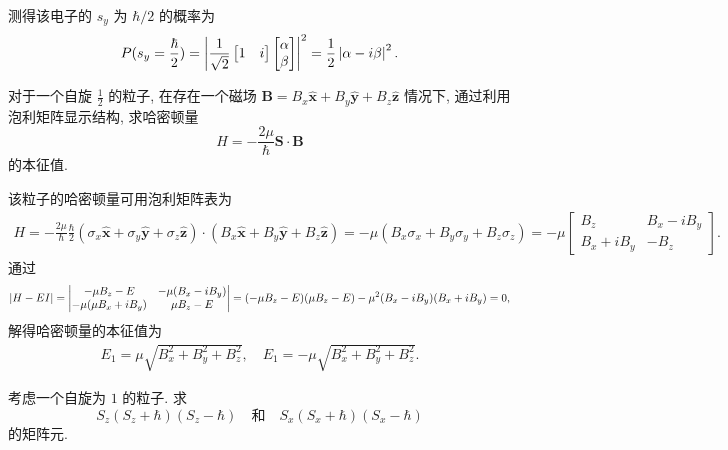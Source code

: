 \documentclass{assignment}
\begin{document}
\begin{sol}
    测得该电子的 $s_y$ 为 $\hbar/2$ 的概率为
    \begin{align}
        P(s_y=\frac{\hbar}{2})=\left\lvert\frac{1}{\sqrt{2}}\begin{bmatrix}
            1&i
        \end{bmatrix}\begin{bmatrix}
            \alpha\\
            \beta
        \end{bmatrix}\right\rvert^2=\frac{1}{2}\left\lvert\alpha-i\beta\right\rvert^2.
    \end{align}
\end{sol}

\begin{prob}[课本习题 3.2]
    对于一个自旋 $\frac{1}{2}$ 的粒子, 在存在一个磁场 $\bm{B}=B_x\hat{\bm{x}}+B_y\hat{\bm{y}}+B_z\hat{\bm{z}}$ 情况下, 通过利用泡利矩阵显示结构, 求哈密顿量
    \[
        H=-\frac{2\mu}{\hbar}\bm{S}\cdot\bm{B}
    \]
    的本征值.
\end{prob}
\begin{sol}
    该粒子的哈密顿量可用泡利矩阵表为
    \begin{align}
        H=-\frac{2\mu}{\hbar}\frac{\hbar}{2}(\sigma_x\hat{\bm{x}}+\sigma_y\hat{\bm{y}}+\sigma_z\hat{\bm{z}})\cdot(B_x\hat{\bm{x}}+B_y\hat{\bm{y}}+B_z\hat{\bm{z}})=-\mu(B_x\sigma_x+B_y\sigma_y+B_z\sigma_z)=-\mu\begin{bmatrix}
            B_z&B_x-iB_y\\
            B_x+iB_y&-B_z
        \end{bmatrix}.
    \end{align}
    通过
    \begin{align}
        \left\lvert H-EI\right\rvert=\begin{vmatrix}
            -\mu B_z-E&-\mu(B_x-iB_y)\\
            -\mu(\mu B_x+iB_y)&\mu B_z-E
        \end{vmatrix}=(-\mu B_z-E)(\mu B_z-E)-\mu^2(B_x-iB_y)(B_x+iB_y)=0,
    \end{align}
    解得哈密顿量的本征值为
    \begin{align}
        E_1=\mu\sqrt{B_x^2+B_y^2+B_z^2},\quad E_1=-\mu\sqrt{B_x^2+B_y^2+B_z^2}.
    \end{align}
\end{sol}

\begin{prob}[课本习题 3.5]
    考虑一个自旋为 $1$ 的粒子. 求
    \[
        S_z(S_z+\hbar)(S_z-\hbar)\quad\text{和}\quad S_x(S_x+\hbar)(S_x-\hbar)
    \]
    的矩阵元.
\end{prob}
\begin{pf}

\end{pf}
\end{document}
